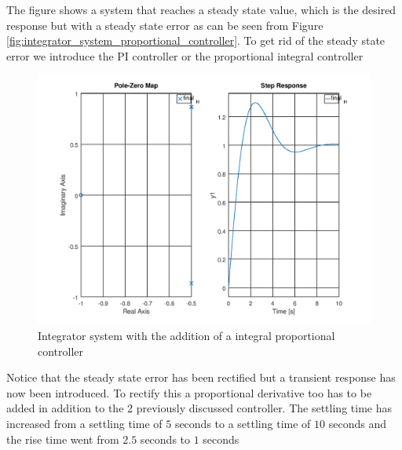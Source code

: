 \documentclass[a4paper, 12pt]{article}
\begin{document}
The figure shows a system that reaches a steady state value, which is the
desired response but with a steady state error as can be seen from Figure
\ref{fig:integrator_system_proportional_controller}. To get rid of the steady
state error we introduce the PI controller or the proportional integral
controller

\begin{figure}[H]
	\centering
	\includegraphics[width=\textwidth]{integrator_system_proportional_integral_controller.png}
	\caption{Integrator system with the addition of a integral proportional controller}
	\label{fig:integrator_system_proportional_integral_controller}
\end{figure}

Notice that the steady state error has been rectified but a transient response
has now been introduced. To rectify this a proportional derivative too has to
be added in addition to the 2 previously discussed controller. The settling
time has increased from a settling time of $5$ seconds to a settling time of
$10$ seconds and the rise time went from $2.5$ seconds to $1$ seconds
\end{document}
